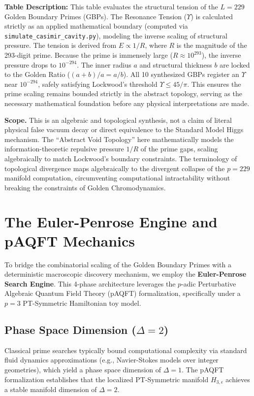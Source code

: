 \textbf{Table Description:} This table evaluates the structural tension of the $L=229$ Golden Boundary Primes (GBPs). The Resonance Tension ($\Upsilon$) is calculated strictly as an applied mathematical boundary (computed via \texttt{simulate\_casimir\_cavity.py}), modeling the inverse scaling of structural pressure. The tension is derived from $E \propto 1/R$, where $R$ is the magnitude of the 293-digit prime. Because the prime is immensely large ($R \approx 10^{293}$), the inverse pressure drops to $10^{-294}$. The inner radius $a$ and structural thickness $b$ are locked to the Golden Ratio ($(a+b)/a = a/b$). All 10 synthesized GBPs register an $\Upsilon$ near $10^{-294}$, safely satisfying Lockwood's threshold $\Upsilon \le 45/\pi$. This ensures the prime scaling remains bounded strictly in the abstract topology, serving as the necessary mathematical foundation before any physical interpretations are made.

\textbf{Scope.} This is an algebraic and topological synthesis, not a claim of literal physical false vacuum decay or direct equivalence to the Standard Model Higgs mechanism. The ``Abstract Void Topology'' here mathematically models the information-theoretic repulsive pressure $1/R$ of the prime gaps, scaling algebraically to match Lockwood's boundary constraints. The terminology of topological divergence maps algebraically to the divergent collapse of the $p=229$ manifold computation, circumventing computational intractability without breaking the constraints of Golden Chromodynamics.

\section{The Euler-Penrose Engine and pAQFT Mechanics}
\label{sec:paqft_mechanics}

To bridge the combinatorial scaling of the Golden Boundary Primes with a deterministic macroscopic discovery mechanism, we employ the \textbf{Euler-Penrose Search Engine}. This 4-phase architecture leverages the $p$-adic Perturbative Algebraic Quantum Field Theory (pAQFT) formalization, specifically under a $p=3$ PT-Symmetric Hamiltonian toy model.

\subsection{Phase Space Dimension ($\Delta = 2$)}
Classical prime searches typically bound computational complexity via standard fluid dynamics approximations (e.g., Navier-Stokes models over integer geometries), which yield a phase space dimension of $\Delta = 1$. The pAQFT formalization establishes that the localized PT-Symmetric manifold $H_{3,\epsilon}$ achieves a stable manifold dimension of $\Delta = 2$.


